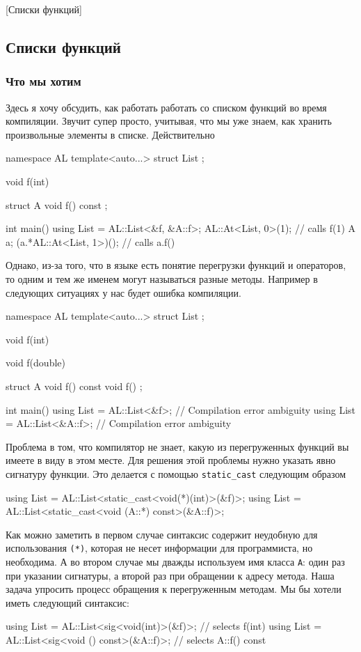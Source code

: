 [Списки функций]


\subsection{Списки функций}
\label{section::FunctionList}

\subsubsection{Что мы хотим}

Здесь я хочу обсудить, как работать работать со списком функций во время компиляции.
Звучит супер просто, учитывая, что мы уже знаем, как хранить произвольные элементы в списке.
Действительно
\begin{cppcode}
namespace AL {
template<auto...>
struct List {};
}

void f(int) {}

struct A {
  void f() const {}
};

int main() {
  using List = AL::List<&f, &A::f>;
  AL::At<List, 0>(1); // calls f(1)
  A a;
  (a.*AL::At<List, 1>)(); // calls a.f()
}
\end{cppcode}
Однако, из-за того, что в языке есть понятие перегрузки функций и операторов, то одним и тем же именем могут называться разные методы.
Например в следующих ситуациях у нас будет ошибка компиляции.
\begin{cppcode}
namespace AL {
template<auto...>
struct List {};
}

void f(int) {}

void f(double) {}

struct A {
  void f() const {}
  void f() {}
};

int main() {
  using List = AL::List<&f>; // Compilation error ambiguity
  using List = AL::List<&A::f>; // Compilation error ambiguity
}
\end{cppcode}
Проблема в том, что компилятор не знает, какую из перегруженных функций вы имеете в виду в этом месте.
Для решения этой проблемы нужно указать явно сигнатуру функции.
Это делается с помощью \verb"static_cast" следующим образом
\begin{cppcode}
using List = AL::List<static_cast<void(*)(int)>(&f)>;
using List = AL::List<static_cast<void (A::*) const>(&A::f)>; 
\end{cppcode}
Как можно заметить в первом случае синтаксис содержит неудобную для использования \verb"(*)", которая не несет информации для программиста, но необходима.
А во втором случае мы дважды используем имя класса \verb"A": один раз при указании сигнатуры, а второй раз при обращении к адресу метода.
Наша задача упросить процесс обращения к перегруженным методам.
Мы бы хотели иметь следующий синтаксис:
\begin{cppcode}
using List = AL::List<sig<void(int)>(&f)>; // selects f(int)
using List = AL::List<sig<void () const>(&A::f)>;  // selects A::f() const
\end{cppcode}

